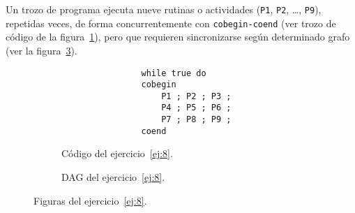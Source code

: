\begin{ejercicio}\label{ej:8}
    Un trozo de programa ejecuta nueve rutinas o actividades (\verb|P1|, \verb|P2|, \ldots, \verb|P9|), repetidas veces,
    de forma concurrentemente con \verb|cobegin-coend| (ver trozo de código de la figura~\ref{code:ej8_enunciado}), pero que requieren
    sincronizarse según determinado grafo (ver la figura~\ref{fig:ej8_grafo}).
    \begin{figure}
        \centering
        \begin{subfigure}{0.45\textwidth}
            \centering
            \begin{verbatim}
                while true do
                cobegin
                    P1 ; P2 ; P3 ;
                    P4 ; P5 ; P6 ;
                    P7 ; P8 ; P9 ;
                coend
            \end{verbatim}
            \caption{Código del ejercicio~\ref{ej:8}.}
            \label{code:ej8_enunciado}
        \end{subfigure} \hfill
        \begin{subfigure}{0.45\textwidth}
            \centering
            \caption{DAG del ejercicio~\ref{ej:8}.}
            \label{fig:ej8_grafo}
        \end{subfigure}
        \caption{Figuras del ejercicio~\ref{ej:8}.}
    \end{figure}


\end{ejercicio}
